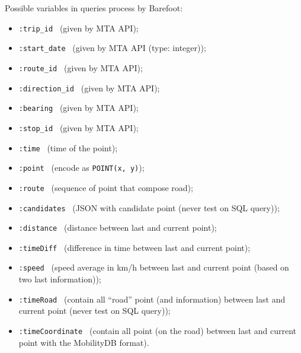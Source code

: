 \documentclass[a4paper,12pt]{article}
\begin{document}
            Possible variables in queries process by Barefoot:
            \begin{itemize}
                \item \verb|:trip_id | (given by MTA API);
                \item \verb|:start_date | (given by MTA API (type: integer));
                \item \verb|:route_id | (given by MTA API);
                \item \verb|:direction_id | (given by MTA API);
                \item \verb|:bearing | (given by MTA API);
                \item \verb|:stop_id | (given by MTA API);
                \item \verb|:time | (time of the point);
                \item \verb|:point | (encode as \verb|POINT(x, y)|);
                \item \verb|:route | (sequence of point that compose road);
                \item \verb|:candidates | (JSON with candidate point (never test on SQL query));
                \item \verb|:distance | (distance between last and current point);
                \item \verb|:timeDiff | (difference in time between last and current point);
                \item \verb|:speed | (speed average in km/h between last and current point (based on two last information));
                \item \verb|:timeRoad | (contain all ``road'' point (and information) between last and current point (never test on SQL query));
                \item \verb|:timeCoordinate | (contain all point (on the road) between last and current point with the MobilityDB format).
            \end{itemize}
\end{document}
